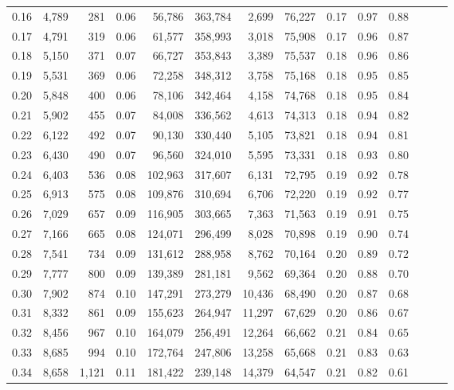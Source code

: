 \begin{tabular}{rrrrrrrrrrrrrr}
0.16 &  4,789 &    281 &  0.06 &   56,786 &  363,784 &   2,699 &  76,227 &  0.17 &  0.97 &      0.88 \\
0.17 &  4,791 &    319 &  0.06 &   61,577 &  358,993 &   3,018 &  75,908 &  0.17 &  0.96 &      0.87 \\
0.18 &  5,150 &    371 &  0.07 &   66,727 &  353,843 &   3,389 &  75,537 &  0.18 &  0.96 &      0.86 \\
0.19 &  5,531 &    369 &  0.06 &   72,258 &  348,312 &   3,758 &  75,168 &  0.18 &  0.95 &      0.85 \\
0.20 &  5,848 &    400 &  0.06 &   78,106 &  342,464 &   4,158 &  74,768 &  0.18 &  0.95 &      0.84 \\
0.21 &  5,902 &    455 &  0.07 &   84,008 &  336,562 &   4,613 &  74,313 &  0.18 &  0.94 &      0.82 \\
0.22 &  6,122 &    492 &  0.07 &   90,130 &  330,440 &   5,105 &  73,821 &  0.18 &  0.94 &      0.81 \\
0.23 &  6,430 &    490 &  0.07 &   96,560 &  324,010 &   5,595 &  73,331 &  0.18 &  0.93 &      0.80 \\
0.24 &  6,403 &    536 &  0.08 &  102,963 &  317,607 &   6,131 &  72,795 &  0.19 &  0.92 &      0.78 \\
0.25 &  6,913 &    575 &  0.08 &  109,876 &  310,694 &   6,706 &  72,220 &  0.19 &  0.92 &      0.77 \\
0.26 &  7,029 &    657 &  0.09 &  116,905 &  303,665 &   7,363 &  71,563 &  0.19 &  0.91 &      0.75 \\
0.27 &  7,166 &    665 &  0.08 &  124,071 &  296,499 &   8,028 &  70,898 &  0.19 &  0.90 &      0.74 \\
0.28 &  7,541 &    734 &  0.09 &  131,612 &  288,958 &   8,762 &  70,164 &  0.20 &  0.89 &      0.72 \\
0.29 &  7,777 &    800 &  0.09 &  139,389 &  281,181 &   9,562 &  69,364 &  0.20 &  0.88 &      0.70 \\
0.30 &  7,902 &    874 &  0.10 &  147,291 &  273,279 &  10,436 &  68,490 &  0.20 &  0.87 &      0.68 \\
0.31 &  8,332 &    861 &  0.09 &  155,623 &  264,947 &  11,297 &  67,629 &  0.20 &  0.86 &      0.67 \\
0.32 &  8,456 &    967 &  0.10 &  164,079 &  256,491 &  12,264 &  66,662 &  0.21 &  0.84 &      0.65 \\
0.33 &  8,685 &    994 &  0.10 &  172,764 &  247,806 &  13,258 &  65,668 &  0.21 &  0.83 &      0.63 \\
0.34 &  8,658 &  1,121 &  0.11 &  181,422 &  239,148 &  14,379 &  64,547 &  0.21 &  0.82 &      0.61 \\

\end{tabular}

